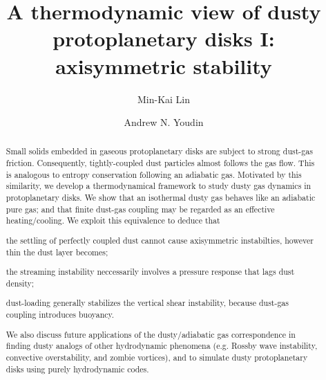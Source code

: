 \documentclass[iop, numberedappendix]{emulateapj}
\begin{document}
\title{A thermodynamic view of dusty protoplanetary disks I:
axisymmetric stability}
\author{Min-Kai Lin}
\author{Andrew N. Youdin}

\begin{abstract}
  Small solids embedded in gaseous protoplanetary disks are subject
  to strong dust-gas friction. Consequently, tightly-coupled dust
  particles almost follows the gas flow. 
  This is analogous to entropy conservation
  following an adiabatic gas.  
  Motivated by this similarity, we develop a thermodynamical
  framework to study dusty gas dynamics in protoplanetary disks. We  
 show that an isothermal dusty gas behaves like an  
  adiabatic pure gas; and that finite dust-gas coupling may be
  regarded as an effective 
  heating/cooling. We exploit this equivalence 
  to deduce that   
\begin{inparaenum}[1)] 
\item 
 the settling of perfectly coupled dust cannot cause axisymmetric 
 instabilties, however thin the dust layer becomes; 
\item 
  the streaming instability neccessarily involves a pressure response
  that lags dust density; 
\item dust-loading generally stabilizes the vertical shear
  instability, because dust-gas coupling introduces buoyancy. 
\end{inparaenum}  
We also discuss future applications of the dusty/adiabatic gas
correspondence in finding dusty analogs of other hydrodynamic
phenomena (e.g. Rossby wave instability, convective overstability, and 
zombie vortices), and to simulate dusty protoplanetary disks
using purely hydrodynamic codes. %

\end{abstract}
\end{document}
